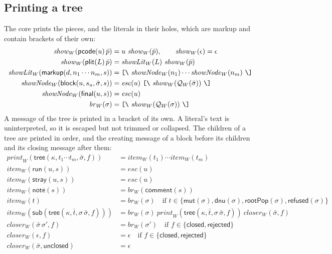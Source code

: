 \documentclass[11pt]{article}
\numberwithin{equation}{section}
\newcommand{\kw}[1]{\ensuremath{\mathsf{#1}}}
\newcommand{\str}[1]{\ensuremath{\text{\texttt{#1}}}}
\newcommand{\bs}{\textbackslash}
\newcommand{\Open}{\str{[\bs}}
\newcommand{\Close}{\str{\bs]}}
\begin{document}
\subsection{Printing a tree}

The core prints the pieces, and the literals in their holes, which are
markup and contain brackets of their own:
\begin{equation}\label{eq:print-message}
\begin{aligned}
\mathit{show}_W(\kw{pcode}(u)\,\bar p) &= u\ \mathit{show}_W(\bar p),
  \qquad \mathit{show}_W(\epsilon) = \epsilon \\
\mathit{show}_W(\kw{plit}(L)\,\bar p) &=
  \mathit{showLit}_W(L)\ \mathit{show}_W(\bar p) \\
\mathit{showLit}_W(\kw{markup}(d, n_1 \cdots n_m, s)) &=
  \Open\ \mathit{showNode}_W(n_1) \cdots \mathit{showNode}_W(n_m)\ \Close \\
\mathit{showNode}_W(\kw{block}(u, s_u, \bar\sigma, s)) &=
  \mathit{esc}(u)\ \Open\ \mathit{show}_W(\mathcal{Q}_W(\bar\sigma))\ \Close \\
\mathit{showNode}_W(\kw{final}(u, s)) &= \mathit{esc}(u) \\
\mathit{br}_W(\sigma) &= \Open\ \mathit{show}_W(\mathcal{Q}_W(\sigma))\ \Close
\end{aligned}
\end{equation}
A message of the tree is printed in a bracket of its own.  A literal's
text is uninterpreted, so it is escaped but not trimmed or collapsed.
The children of a tree are printed in order, and the creating message of a
block before its children and its closing message after them:
\begin{equation}\label{eq:print-tree}
\begin{aligned}
\mathit{print}_W(\kw{tree}(\kappa, t_1 \cdots t_m, \bar\sigma, f)) &=
  \mathit{item}_W(t_1) \cdots \mathit{item}_W(t_m) \\
\mathit{item}_W(\kw{run}(u, s)) &= \mathit{esc}(u) \\
\mathit{item}_W(\kw{stray}(u, s)) &= \mathit{esc}(u) \\
\mathit{item}_W(\kw{note}(s)) &= \mathit{br}_W(\kw{comment}(s)) \\
\mathit{item}_W(t) &= \mathit{br}_W(\sigma)
  \quad\text{if } t \in \{\kw{mut}(\sigma), \kw{dnu}(\sigma),
    \kw{rootPop}(\sigma), \kw{refused}(\sigma)\} \\
\mathit{item}_W(\kw{sub}(\kw{tree}(\kappa, \bar t, \sigma\,\bar\sigma, f))) &=
  \mathit{br}_W(\sigma)\ \mathit{print}_W(\kw{tree}(\kappa, \bar t,
    \sigma\,\bar\sigma, f))\ \mathit{closer}_W(\bar\sigma, f) \\
\mathit{closer}_W(\bar\sigma\,\sigma', f) &= \mathit{br}_W(\sigma')
  \quad\text{if } f \in \{\kw{closed}, \kw{rejected}\} \\
\mathit{closer}_W(\epsilon, f) &= \epsilon
  \quad\text{if } f \in \{\kw{closed}, \kw{rejected}\} \\
\mathit{closer}_W(\bar\sigma, \kw{unclosed}) &= \epsilon
\end{aligned}
\end{equation}
\end{document}
